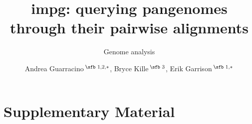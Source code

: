 \documentclass[noinfo]{bioinfo}
\begin{document}
\subtitle{Genome analysis}

\title[impg]{impg: querying pangenomes through their pairwise alignments}
\author[Guarracino \textit{et~al}.]{
Andrea Guarracino\,$^{\text{\sfb 1,2},*}$,
Bryce Kille\,$^{\text{\sfb 3}}$,
Erik Garrison\,$^{\text{\sfb 1},*}$
}
\address{
$^{\text{\sf 1}}$Department of Genetics, Genomics and Informatics, University of Tennessee Health Science Center, Memphis, TN 38163, USA \\
$^{\text{\sf 2}}$Bioinnovation and Genome Sciences, The Translational Genomics Research Institute (TGen), Phoenix, AZ 85004, USA \\
$^{\text{\sf 3}}$Illumina Inc., San Diego, CA 92122, USA
}
\history{}
\editor{}

\abstract{}

\maketitle












\clearpage
\onecolumn
\section*{Supplementary Material}
\setcounter{figure}{0}
\setcounter{table}{0}
\renewcommand{\thefigure}{S\arabic{figure}}
\renewcommand{\thetable}{S\arabic{table}}
\renewcommand{\theHfigure}{S\arabic{figure}}
\renewcommand{\theHtable}{S\arabic{table}}


\end{document}
